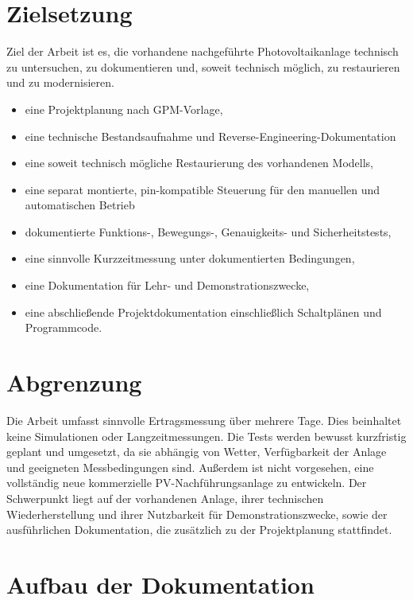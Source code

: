 \section{Zielsetzung}\label{sec:zielsetzung}

Ziel der Arbeit ist es, die vorhandene nachgeführte Photovoltaikanlage technisch zu untersuchen, zu dokumentieren und, soweit technisch möglich, zu restaurieren und zu modernisieren.

\begin{itemize}
    \item eine Projektplanung nach GPM-Vorlage,
    \item eine technische Bestandsaufnahme und Reverse-Engineering-Dokumentation
    \item eine soweit technisch mögliche Restaurierung des vorhandenen Modells,
    \item eine separat montierte, pin-kompatible Steuerung für den manuellen und automatischen Betrieb
    \item dokumentierte Funktions-, Bewegungs-, Genauigkeits- und Sicherheitstests,
    \item eine sinnvolle Kurzzeitmessung unter dokumentierten Bedingungen,
    \item eine Dokumentation für Lehr- und Demonstrationszwecke,
    \item eine abschließende Projektdokumentation einschließlich Schaltplänen und Programmcode.
\end{itemize}

\section{Abgrenzung}\label{sec:abgrenzung}

Die Arbeit umfasst sinnvolle Ertragsmessung über mehrere Tage.
Dies beinhaltet keine Simulationen oder Langzeitmessungen.
Die Tests werden bewusst kurzfristig geplant und umgesetzt, da sie abhängig von Wetter, Verfügbarkeit der Anlage und geeigneten Messbedingungen sind.
Außerdem ist nicht vorgesehen, eine vollständig neue kommerzielle PV-Nachführungsanlage zu entwickeln.
Der Schwerpunkt liegt auf der vorhandenen Anlage, ihrer technischen Wiederherstellung und ihrer Nutzbarkeit für Demonstrationszwecke, sowie der ausführlichen Dokumentation, die zusätzlich zu der Projektplanung stattfindet.

\section{Aufbau der Dokumentation}\label{sec:aufbau-der-dokumentation}

